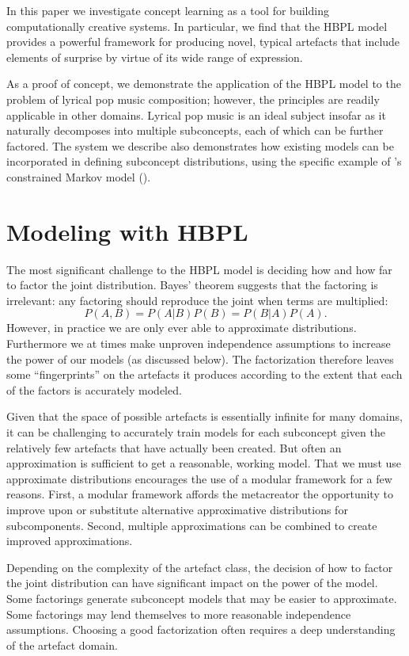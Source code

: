 \documentclass[phd,electronic,oneside,twosidetoc,letterpaper,chaptercenter,parttop,lol,lof,lot]{byumsphd}
\begin{document}
In this paper we investigate concept learning as a tool for building computationally creative systems. In particular, we find that the HBPL model provides a powerful framework for producing novel, typical artefacts that include elements of surprise by virtue of its wide range of expression.

As a proof of concept, we demonstrate the application of the HBPL model to the problem of lyrical pop music composition; however, the principles are readily applicable in other domains. Lyrical pop music is an ideal subject insofar as it naturally decomposes into multiple subconcepts, each of which can be further factored. The system we describe also demonstrates how existing models can be incorporated in defining subconcept distributions, using the specific example of \citeauthor{pachet2011finite}'s constrained Markov model (\citeyear{pachet2011finite}).

\section{Modeling with HBPL}

The most significant challenge to the HBPL model is deciding how and how far to factor the joint distribution. Bayes' theorem suggests that the factoring is irrelevant: any factoring should reproduce the joint when terms are multiplied:
\[ P(A,B) = P(A|B)P(B) = P(B|A)P(A). \]
However, in practice we are only ever able to approximate distributions. Furthermore we at times make unproven independence assumptions to increase the power of our models (as discussed below). The factorization therefore leaves some ``fingerprints'' on the artefacts it produces according to the extent that each of the factors is accurately modeled.

Given that the space of possible artefacts is essentially infinite for many domains, it can be challenging to accurately train models for each subconcept given the relatively few artefacts that have actually been created. But often an approximation is sufficient to get a reasonable, working model. That we must use approximate distributions encourages the use of a modular framework for a few reasons. First, a modular framework affords the metacreator the opportunity to improve upon or substitute alternative approximative distributions for subcomponents. Second, multiple approximations can be combined to create improved approximations.

Depending on the complexity of the artefact class, the decision of how to factor the joint distribution can have significant impact on the power of the model. Some factorings generate subconcept models that may be easier to approximate. Some factorings may lend themselves to more reasonable independence assumptions. Choosing a good factorization often requires a deep understanding of the artefact domain.
\end{document}

